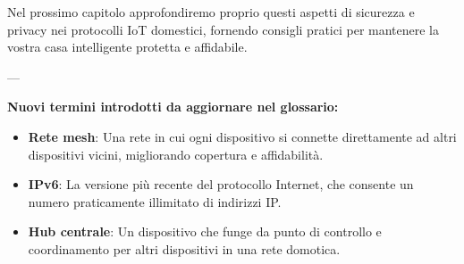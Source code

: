 Nel prossimo capitolo approfondiremo proprio questi aspetti di sicurezza e privacy nei protocolli IoT domestici, fornendo consigli pratici per mantenere la vostra casa intelligente protetta e affidabile.

---

\textbf{Nuovi termini introdotti da aggiornare nel glossario:}
\begin{itemize}
    \item \textbf{Rete mesh}: Una rete in cui ogni dispositivo si connette direttamente ad altri dispositivi vicini, migliorando copertura e affidabilità.
    \item \textbf{IPv6}: La versione più recente del protocollo Internet, che consente un numero praticamente illimitato di indirizzi IP.
    \item \textbf{Hub centrale}: Un dispositivo che funge da punto di controllo e coordinamento per altri dispositivi in una rete domotica.
\end{itemize}